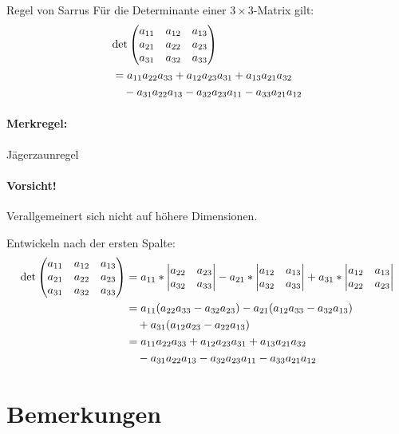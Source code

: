 \begin{satz}{Regel von Sarrus}
	Für die Determinante einer $3\times3$-Matrix gilt:
	\begin{align*}
		&\det\matrix{
		\ma{11} & \ma{12} & \ma{13}\\
		\ma{21} & \ma{22} & \ma{23}\\
		\ma{31} & \ma{32} & \ma{33}
		}\\
		&=\ma{11}\ma{22}\ma{33}+\ma{12}\ma{23}\ma{31}+\ma{13}\ma{21}\ma{32}\\
		&\quad-\ma{31}\ma{22}\ma{13}-\ma{32}\ma{23}\ma{11}-\ma{33}\ma{21}\ma{12}
	\end{align*}
\end{satz}
\paragraph{Merkregel:} \glqq Jägerzaunregel\grqq

\paragraph{Vorsicht!} Verallgemeinert sich nicht auf höhere Dimensionen.

\beweis
Entwickeln nach der ersten Spalte:
\begin{align*}
	\det\matrix{
	\ma{11} & \ma{12} & \ma{13}\\
	\ma{21} & \ma{22} & \ma{23}\\
	\ma{31} & \ma{32} & \ma{33}
	}&=\ma{11}*\detmatrix{\ma{22} & \ma{23}\\\ma{32} & \ma{33}}
	-\ma{21}*\detmatrix{\ma{12} & \ma{13}\\\ma{32} & \ma{33}}
	+\ma{31}*\detmatrix{\ma{12} & \ma{13}\\\ma{22} & \ma{23}}\\
	&=\ma{11}(\ma{22}\ma{33}-\ma{32}\ma{23})-\ma{21}(\ma{12}\ma{33}-\ma{32}\ma{13})\\
	&\quad+\ma{31}(\ma{12}\ma{23}-\ma{22}\ma{13})\\
	&=\ma{11}\ma{22}\ma{33}+\ma{12}\ma{23}\ma{31}+\ma{13}\ma{21}\ma{32}\\
	&\quad-\ma{31}\ma{22}\ma{13}-\ma{32}\ma{23}\ma{11}-\ma{33}\ma{21}\ma{12}
\end{align*}

\section{Bemerkungen}
